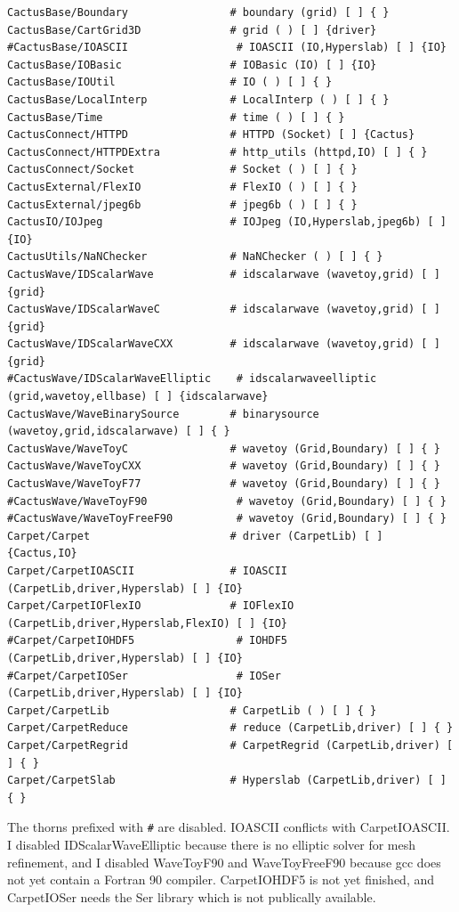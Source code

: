 \begin{verbatim}
CactusBase/Boundary                # boundary (grid) [ ] { }
CactusBase/CartGrid3D              # grid ( ) [ ] {driver}
#CactusBase/IOASCII                 # IOASCII (IO,Hyperslab) [ ] {IO}
CactusBase/IOBasic                 # IOBasic (IO) [ ] {IO}
CactusBase/IOUtil                  # IO ( ) [ ] { }
CactusBase/LocalInterp             # LocalInterp ( ) [ ] { }
CactusBase/Time                    # time ( ) [ ] { }
CactusConnect/HTTPD                # HTTPD (Socket) [ ] {Cactus}
CactusConnect/HTTPDExtra           # http_utils (httpd,IO) [ ] { }
CactusConnect/Socket               # Socket ( ) [ ] { }
CactusExternal/FlexIO              # FlexIO ( ) [ ] { }
CactusExternal/jpeg6b              # jpeg6b ( ) [ ] { }
CactusIO/IOJpeg                    # IOJpeg (IO,Hyperslab,jpeg6b) [ ] {IO}
CactusUtils/NaNChecker             # NaNChecker ( ) [ ] { }
CactusWave/IDScalarWave            # idscalarwave (wavetoy,grid) [ ] {grid}
CactusWave/IDScalarWaveC           # idscalarwave (wavetoy,grid) [ ] {grid}
CactusWave/IDScalarWaveCXX         # idscalarwave (wavetoy,grid) [ ] {grid}
#CactusWave/IDScalarWaveElliptic    # idscalarwaveelliptic (grid,wavetoy,ellbase) [ ] {idscalarwave}
CactusWave/WaveBinarySource        # binarysource (wavetoy,grid,idscalarwave) [ ] { }
CactusWave/WaveToyC                # wavetoy (Grid,Boundary) [ ] { }
CactusWave/WaveToyCXX              # wavetoy (Grid,Boundary) [ ] { }
CactusWave/WaveToyF77              # wavetoy (Grid,Boundary) [ ] { }
#CactusWave/WaveToyF90              # wavetoy (Grid,Boundary) [ ] { }
#CactusWave/WaveToyFreeF90          # wavetoy (Grid,Boundary) [ ] { }
Carpet/Carpet                      # driver (CarpetLib) [ ] {Cactus,IO}
Carpet/CarpetIOASCII               # IOASCII (CarpetLib,driver,Hyperslab) [ ] {IO}
Carpet/CarpetIOFlexIO              # IOFlexIO (CarpetLib,driver,Hyperslab,FlexIO) [ ] {IO}
#Carpet/CarpetIOHDF5                # IOHDF5 (CarpetLib,driver,Hyperslab) [ ] {IO}
#Carpet/CarpetIOSer                 # IOSer (CarpetLib,driver,Hyperslab) [ ] {IO}
Carpet/CarpetLib                   # CarpetLib ( ) [ ] { }
Carpet/CarpetReduce                # reduce (CarpetLib,driver) [ ] { }
Carpet/CarpetRegrid                # CarpetRegrid (CarpetLib,driver) [ ] { }
Carpet/CarpetSlab                  # Hyperslab (CarpetLib,driver) [ ] { }
\end{verbatim}

The thorns prefixed with \texttt{\#} are disabled.  IOASCII conflicts
with CarpetIOASCII.  I disabled IDScalarWaveElliptic because there is
no elliptic solver for mesh refinement, and I disabled WaveToyF90 and
WaveToyFreeF90 because gcc does not yet contain a Fortran 90 compiler.
CarpetIOHDF5 is not yet finished, and CarpetIOSer needs the Ser
library which is not publically available.

